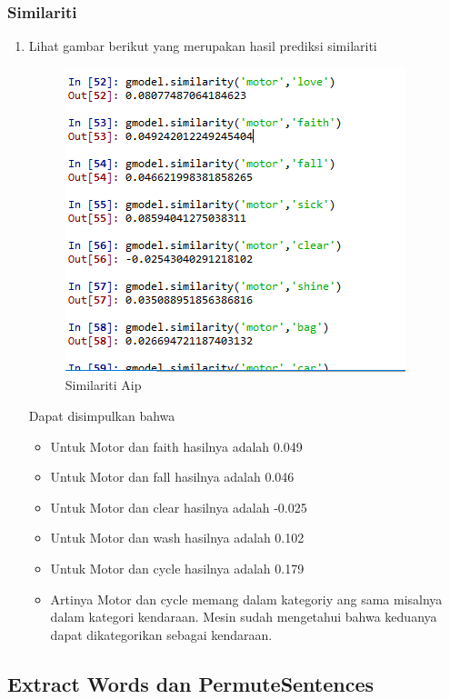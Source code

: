 \subsubsection{Similariti}
\begin{enumerate}
\item Lihat gambar berikut yang merupakan hasil prediksi similariti
\begin{figure}[!hbtp]
\centering
\includegraphics[scale=0.3]{figures/AIP/e17.PNG}
\caption{Similariti Aip}
\label{Praktek}
\end{figure}

Dapat disimpulkan bahwa
\begin{itemize}
\item Untuk Motor dan faith hasilnya adalah 0.049
\item Untuk Motor dan fall hasilnya adalah 0.046
\item Untuk Motor dan clear hasilnya adalah -0.025
\item Untuk Motor dan wash hasilnya adalah 0.102
\item Untuk Motor dan cycle hasilnya adalah 0.179
\item Artinya Motor dan cycle memang dalam kategoriy ang sama misalnya dalam kategori kendaraan. Mesin sudah mengetahui bahwa keduanya dapat dikategorikan sebagai kendaraan.
\end{itemize}
\end{enumerate}

\subsection{Extract Words dan PermuteSentences}
